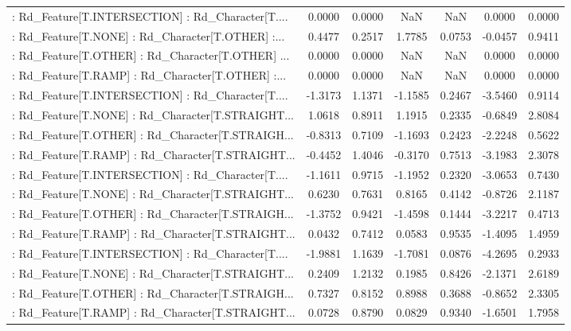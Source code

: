 \begin{longtable}{p{4cm}cccccc}
 : Rd\_Feature[T.INTERSECTION] : Rd\_Character[T.... &  0.0000 &    0.0000 &     NaN &          NaN &  0.0000 &  0.0000 \\
 : Rd\_Feature[T.NONE] : Rd\_Character[T.OTHER] :... &  0.4477 &    0.2517 &  1.7785 &       0.0753 & -0.0457 &  0.9411 \\
 : Rd\_Feature[T.OTHER] : Rd\_Character[T.OTHER] ... &  0.0000 &    0.0000 &     NaN &          NaN &  0.0000 &  0.0000 \\
 : Rd\_Feature[T.RAMP] : Rd\_Character[T.OTHER] :... &  0.0000 &    0.0000 &     NaN &          NaN &  0.0000 &  0.0000 \\
 : Rd\_Feature[T.INTERSECTION] : Rd\_Character[T.... & -1.3173 &    1.1371 & -1.1585 &       0.2467 & -3.5460 &  0.9114 \\
 : Rd\_Feature[T.NONE] : Rd\_Character[T.STRAIGHT... &  1.0618 &    0.8911 &  1.1915 &       0.2335 & -0.6849 &  2.8084 \\
 : Rd\_Feature[T.OTHER] : Rd\_Character[T.STRAIGH... & -0.8313 &    0.7109 & -1.1693 &       0.2423 & -2.2248 &  0.5622 \\
 : Rd\_Feature[T.RAMP] : Rd\_Character[T.STRAIGHT... & -0.4452 &    1.4046 & -0.3170 &       0.7513 & -3.1983 &  2.3078 \\
 : Rd\_Feature[T.INTERSECTION] : Rd\_Character[T.... & -1.1611 &    0.9715 & -1.1952 &       0.2320 & -3.0653 &  0.7430 \\
 : Rd\_Feature[T.NONE] : Rd\_Character[T.STRAIGHT... &  0.6230 &    0.7631 &  0.8165 &       0.4142 & -0.8726 &  2.1187 \\
 : Rd\_Feature[T.OTHER] : Rd\_Character[T.STRAIGH... & -1.3752 &    0.9421 & -1.4598 &       0.1444 & -3.2217 &  0.4713 \\
 : Rd\_Feature[T.RAMP] : Rd\_Character[T.STRAIGHT... &  0.0432 &    0.7412 &  0.0583 &       0.9535 & -1.4095 &  1.4959 \\
 : Rd\_Feature[T.INTERSECTION] : Rd\_Character[T.... & -1.9881 &    1.1639 & -1.7081 &       0.0876 & -4.2695 &  0.2933 \\
 : Rd\_Feature[T.NONE] : Rd\_Character[T.STRAIGHT... &  0.2409 &    1.2132 &  0.1985 &       0.8426 & -2.1371 &  2.6189 \\
 : Rd\_Feature[T.OTHER] : Rd\_Character[T.STRAIGH... &  0.7327 &    0.8152 &  0.8988 &       0.3688 & -0.8652 &  2.3305 \\
 : Rd\_Feature[T.RAMP] : Rd\_Character[T.STRAIGHT... &  0.0728 &    0.8790 &  0.0829 &       0.9340 & -1.6501 &  1.7958 \\

\end{longtable}
